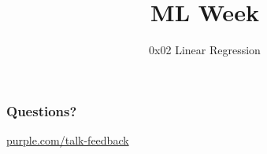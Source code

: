 
\title
{ML Week}
\subtitle{0x02 \hspace{2mm}  Linear Regression}




\begin{frame}
  \titlepage
\end{frame}


\begin{frame}
  \phrase{}
\end{frame}

\begin{frame}
  \frametitle{}

  \begin{mphrase}

  \end{mphrase}
\end{frame}



\begin{frame}
  \frametitle{Questions?}
  \centerline{\large\url{purple.com/talk-feedback}}
\end{frame}


